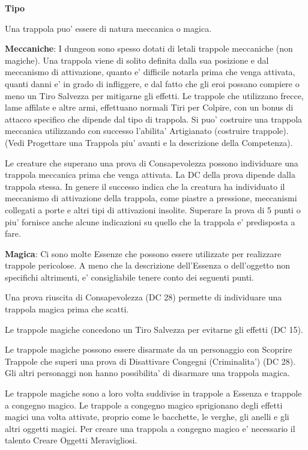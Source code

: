 \documentclass[a4paper,11pt,twoside,openany]{dndbook}
\begin{document}
\textbf{Tipo}

Una trappola puo' essere di natura meccanica o magica.

\textbf{Meccaniche}: I dungeon sono spesso dotati di letali trappole meccaniche (non magiche). Una trappola viene di solito definita dalla sua posizione e dal meccanismo di attivazione, quanto e' difficile notarla prima che venga attivata, quanti danni e' in grado di infliggere, e dal fatto che gli eroi possano compiere o meno un Tiro Salvezza per mitigarne gli effetti. Le trappole che utilizzano frecce, lame affilate e altre armi, effettuano normali Tiri per Colpire, con un bonus di attacco specifico che dipende dal tipo di trappola. Si puo' costruire una trappola meccanica utilizzando con successo l'abilita' Artigianato (costruire trappole). (Vedi Progettare una Trappola piu' avanti e la descrizione della Competenza).

Le creature che superano una prova di Consapevolezza possono individuare una trappola meccanica prima che venga attivata. La DC della prova dipende dalla trappola stessa. In genere il successo indica che la creatura ha individuato il meccanismo di attivazione della trappola, come piastre a pressione, meccanismi collegati a porte e altri tipi di attivazioni insolite. Superare la prova di 5 punti o piu' fornisce anche alcune indicazioni su quello che la trappola e' predisposta a fare.

\textbf{Magica}: Ci sono molte Essenze che possono essere utilizzate per realizzare trappole pericolose. A meno che la descrizione dell'Essenza o dell'oggetto non specifichi altrimenti, e' consigliabile tenere conto dei seguenti punti.

Una prova riuscita di Consapevolezza (DC 28) permette di individuare una trappola magica prima che scatti.

Le trappole magiche concedono un Tiro Salvezza per evitarne gli effetti (DC 15).

Le trappole magiche possono essere disarmate da un personaggio con Scoprire Trappole che superi una prova di Disattivare Congegni (Criminalita') (DC 28). Gli altri personaggi non hanno possibilita' di disarmare una trappola magica.

Le trappole magiche sono a loro volta suddivise in trappole a Essenza e trappole a congegno magico. Le trappole a congegno magico sprigionano degli effetti magici una volta attivate, proprio come le bacchette, le verghe, gli anelli e gli altri oggetti magici. Per creare una trappola a congegno magico e' necessario il talento Creare Oggetti Meravigliosi. 
\end{document}
